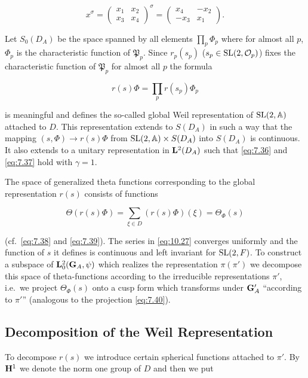 \[
x^\sigma = \begin{pmatrix} x_1 & x_2 \\ x_3 & x_4 \end{pmatrix}^{\sigma} = \begin{pmatrix} x_4 & -x_2 \\ -x_3 & x_1 \end{pmatrix}.
\]

Let $S_0(D_A)$ be the space spanned by all elements $\prod_p \Phi_p$ where for almost all $p$, $\Phi_p$ is the characteristic function of $\mathfrak{P}_p$. Since $r_p(s_p)$ ($s_p \in \operatorname{SL}(2, \mathcal{O}_p)$) fixes the characteristic function of $\mathfrak{P}_p$ for almost all $p$ the formula

\[
r(s)\Phi = \prod_p r(s_p)\Phi_p
\]

is meaningful and defines the so-called global Weil representation of $\operatorname{SL}(2, \mathbb{A})$ attached to $D$. This representation extends to $S(D_A)$ in such a way that the mapping $(s, \Phi) \to r(s)\Phi$ from $\operatorname{SL}(2, \mathbb{A}) \times S(D_A)$ into $S(D_A)$ is continuous. It also extends to a unitary representation in $\mathbf{L}^2(D_A)$ such that \eqref{eq:7.36} and \eqref{eq:7.37} hold with $\gamma = 1$.

The space of generalized theta functions corresponding to the global representation $r(s)$ consists of functions

\begin{equation}\label{eq:10.25}
\Theta(r(s)\Phi) = \sum_{\xi \in D}(r(s)\Phi)(\xi) = \Theta_\Phi(s)\tag{10.25}
\end{equation}

(cf.\ \eqref{eq:7.38} and \eqref{eq:7.39}). The series in \eqref{eq:10.27} converges uniformly and the function of $s$ it defines is continuous and left invariant for $\operatorname{SL}(2, F)$. To construct a subspace of $\mathbf{L}_0^2(\mathbf{G}_A, \psi)$ which realizes the representation $\pi(\pi')$ we decompose this space of theta-functions according to the irreducible representations $\pi'$, i.e.\ we project $\Theta_\Phi(s)$ onto a cusp form which transforms under $\mathbf{G}'_A$ ``according to $\pi'$'' (analogous to the projection \eqref{eq:7.40}).

\subsection{Decomposition of the Weil Representation}

To decompose $r(s)$ we introduce certain spherical functions attached to $\pi'$. By $\mathbf{H}^1$ we denote the norm one group of $D$ and then we put

